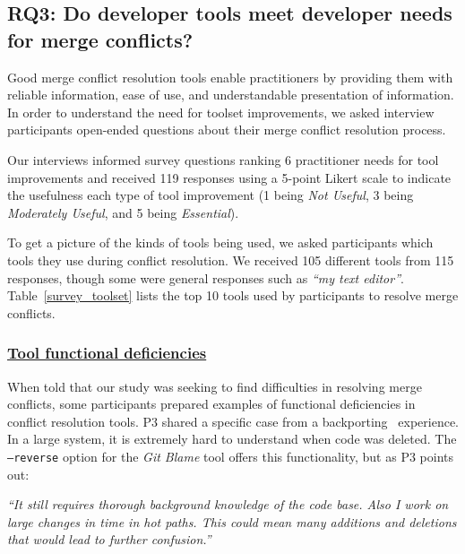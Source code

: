 \subsection{\textbf{RQ3:} Do developer tools meet developer needs for merge conflicts?}\label{RQ3}
Good merge conflict resolution tools enable practitioners by providing them with reliable information, ease of use, and understandable presentation of information. In order to understand the need for toolset improvements, we asked interview participants open-ended questions about their merge conflict resolution process.

Our interviews informed survey questions ranking 6 practitioner needs for tool improvements and received 119 responses using a 5-point Likert scale to indicate the usefulness each type of tool improvement (1 being \textit{Not Useful}, 3 being \textit{Moderately Useful}, and 5 being \textit{Essential}).

To get a picture of the kinds of tools being used, we asked participants which tools they use during conflict resolution. We received 105 different tools from 115 responses, though some were general responses such as \textit{``my text editor''}. Table~\ref{survey_toolset} lists the top 10 tools used by participants to resolve merge conflicts.


\subsubsection{\underline{Tool functional deficiencies}}
When told that our study was seeking to find difficulties in resolving merge conflicts, some participants prepared examples of functional deficiencies in conflict resolution tools. P3 shared a specific case from a backporting~\cite{gutzmann2009backporting} experience. In a large system, it is extremely hard to understand when code was deleted. The \texttt{--reverse} option for the \textit{Git Blame} tool offers this functionality, but as P3 points out:  

\begin{displayquote}
\textit{``It still requires thorough background knowledge of the code base. Also I work on large changes in time in hot paths. This could mean many additions and deletions that would lead to further confusion.''}
\end{displayquote}

